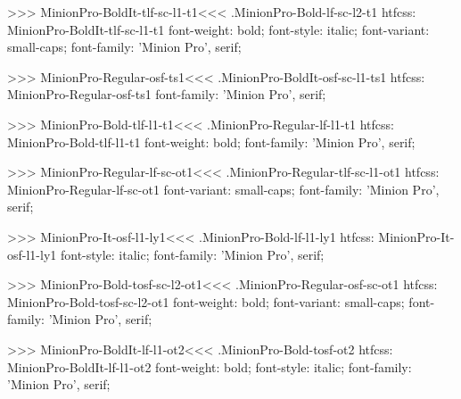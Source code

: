 {>>>
\<MinionPro-BoldIt-tlf-sc-l1-t1\><<<
.MinionPro-Bold-lf-sc-l2-t1
htfcss:  MinionPro-BoldIt-tlf-sc-l1-t1  font-weight: bold; font-style: italic; font-variant: small-caps; font-family: 'Minion Pro', serif;

>>>
\<MinionPro-Regular-osf-ts1\><<<
.MinionPro-BoldIt-osf-sc-l1-ts1
htfcss:  MinionPro-Regular-osf-ts1  font-family: 'Minion Pro', serif;

>>>
\<MinionPro-Bold-tlf-l1-t1\><<<
.MinionPro-Regular-lf-l1-t1
htfcss:  MinionPro-Bold-tlf-l1-t1  font-weight: bold; font-family: 'Minion Pro', serif;

>>>
\<MinionPro-Regular-lf-sc-ot1\><<<
.MinionPro-Regular-tlf-sc-l1-ot1
htfcss:  MinionPro-Regular-lf-sc-ot1  font-variant: small-caps; font-family: 'Minion Pro', serif;

>>>
\<MinionPro-It-osf-l1-ly1\><<<
.MinionPro-Bold-lf-l1-ly1
htfcss:  MinionPro-It-osf-l1-ly1  font-style: italic; font-family: 'Minion Pro', serif;

>>>
\<MinionPro-Bold-tosf-sc-l2-ot1\><<<
.MinionPro-Regular-osf-sc-ot1
htfcss:  MinionPro-Bold-tosf-sc-l2-ot1  font-weight: bold; font-variant: small-caps; font-family: 'Minion Pro', serif;

>>>
\<MinionPro-BoldIt-lf-l1-ot2\><<<
.MinionPro-Bold-tosf-ot2
htfcss:  MinionPro-BoldIt-lf-l1-ot2  font-weight: bold; font-style: italic; font-family: 'Minion Pro', serif;

}
